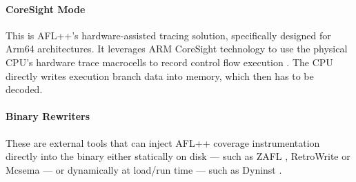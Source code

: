 \paragraph{CoreSight Mode} This is AFL++'s hardware-assisted tracing solution, specifically designed for Arm64 architectures. It leverages ARM CoreSight technology to use the physical CPU's hardware trace macrocells to record control flow execution \cite{shan2023crowbar}. The CPU directly writes execution branch data into memory, which then has to be decoded. 

\paragraph{Binary Rewriters} These are external tools that can inject AFL++ coverage instrumentation directly into the binary either statically on disk --- such as ZAFL \cite{nagy2021breaking}, RetroWrite \cite{dinesh2020retrowrite} or Mcsema \cite{dinaburg2014mcsema} --- or dynamically at load/run time --- such as Dyninst \cite{buck2000api}.